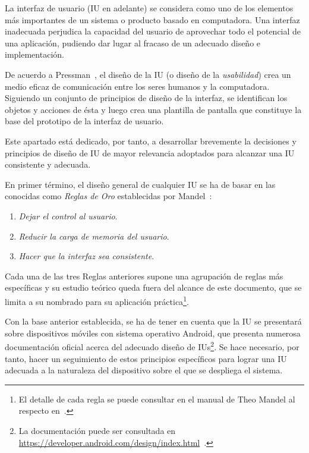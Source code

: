 La interfaz de usuario (IU en adelante) se considera como uno de los elementos más importantes de un sistema o producto basado en computadora. Una interfaz inadecuada perjudica la capacidad del usuario de aprovechar todo el potencial de una aplicación, pudiendo dar lugar al fracaso de un adecuado diseño e implementación.

De acuerdo a Pressman~\cite{Pre10}, el diseño de la IU (o diseño de la \emph{usabilidad}) crea un medio eficaz de comunicación entre los seres humanos y la computadora. Siguiendo un conjunto de principios de diseño de la interfaz, se identifican los objetos y acciones de ésta y luego crea una plantilla de pantalla que constituye la base del prototipo de la interfaz de usuario.

Este apartado está dedicado, por tanto, a desarrollar brevemente la decisiones y principios de diseño de IU de mayor relevancia adoptados para alcanzar una IU consistente y adecuada.

En primer término, el diseño general de cualquier IU se ha de basar en las conocidas como \emph{Reglas de Oro} establecidas por Mandel~\cite{Man97}:

\begin{enumerate}
	\item{\textit{Dejar el control al usuario}}.
	\item{\textit{Reducir la carga de memoria del usuario}}.
	\item{\textit{Hacer que la interfaz sea consistente}}.
\end{enumerate}

Cada una de las tres Reglas anteriores supone una agrupación de reglas más específicas y su estudio teórico queda fuera del alcance de este documento, que se limita a su nombrado para su aplicación práctica\footnote{El detalle de cada regla se puede consultar en el manual de Theo Mandel al respecto en~\cite{Man97}.}.

Con la base anterior establecida, se ha de tener en cuenta que la IU se presentará sobre dispositivos móviles con sistema operativo Android, que presenta numerosa documentación oficial acerca del adecuado diseño de IUs\footnote{La documentación puede ser consultada en \url{https://developer.android.com/design/index.html}~\cite{AnDev}.}. Se hace necesario, por tanto, hacer un seguimiento de estos principios específicos para lograr una IU adecuada a la naturaleza del dispositivo sobre el que se despliega el sistema.

